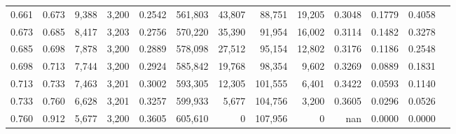 \begin{tabular}{rrrrrrrrrrrrr}
0.661 & 0.673 &  9,388 & 3,200 &                                     0.2542 & 561,803 &  43,807 &  88,751 &  19,205 & 0.3048 & 0.1779 & 0.4058 \\
0.673 & 0.685 &  8,417 & 3,203 &                                     0.2756 & 570,220 &  35,390 &  91,954 &  16,002 & 0.3114 & 0.1482 & 0.3278 \\
0.685 & 0.698 &  7,878 & 3,200 &                                     0.2889 & 578,098 &  27,512 &  95,154 &  12,802 & 0.3176 & 0.1186 & 0.2548 \\
0.698 & 0.713 &  7,744 & 3,200 &                                     0.2924 & 585,842 &  19,768 &  98,354 &   9,602 & 0.3269 & 0.0889 & 0.1831 \\
0.713 & 0.733 &  7,463 & 3,201 &                                     0.3002 & 593,305 &  12,305 & 101,555 &   6,401 & 0.3422 & 0.0593 & 0.1140 \\
0.733 & 0.760 &  6,628 & 3,201 &                                     0.3257 & 599,933 &   5,677 & 104,756 &   3,200 & 0.3605 & 0.0296 & 0.0526 \\
0.760 & 0.912 &  5,677 & 3,200 &                                     0.3605 & 605,610 &       0 & 107,956 &       0 &    nan & 0.0000 & 0.0000 \\
\bottomrule
\end{tabular}

